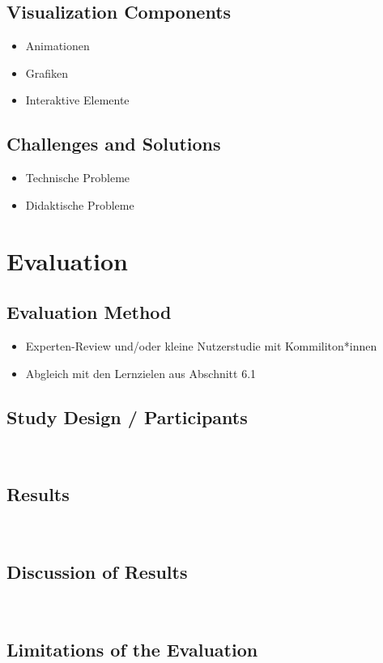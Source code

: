 \documentclass[a4paper,11pt]{article}
\begin{document}
\subsection{Visualization Components}
\begin{itemize}
	\item Animationen
	\item Grafiken
	\item Interaktive Elemente
\end{itemize}

\subsection{Challenges and Solutions}
\begin{itemize}
	\item Technische Probleme
	\item Didaktische Probleme
\end{itemize}

\section{Evaluation}

\subsection{Evaluation Method}
\begin{itemize}
	\item Experten-Review und/oder kleine Nutzerstudie mit Kommiliton*innen
	\item Abgleich mit den Lernzielen aus Abschnitt 6.1
\end{itemize}

\subsection{Study Design / Participants}
\ %

\subsection{Results}
\ %

\subsection{Discussion of Results}
\ %

\subsection{Limitations of the Evaluation}
\ %
\end{document}
